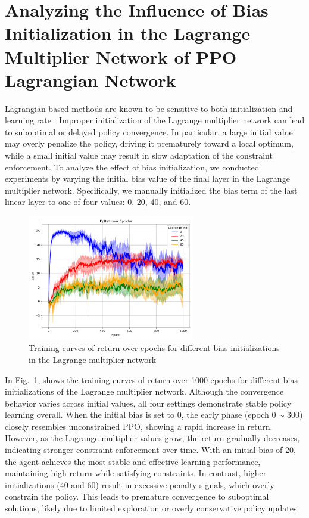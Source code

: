 \section{Analyzing the Influence of Bias Initialization in the Lagrange Multiplier Network of PPO Lagrangian Network} \label{chap4:sec:experiments:lagrange_init}

Lagrangian-based methods are known to be sensitive to both initialization and learning rate \cite{CRL-survey}. 
Improper initialization of the Lagrange multiplier network can lead to suboptimal or delayed policy convergence. 
In particular, a large initial value may overly penalize the policy, driving it prematurely toward a local optimum, while a small initial value may result in slow adaptation of the constraint enforcement.
To analyze the effect of bias initialization,  we conducted experiments by varying the initial bias value of the final layer in the Lagrange multiplier network. 
Specifically, we manually initialized the bias term of the last linear layer to one of four values: 0, 20, 40, and 60.

\begin{figure}[h]
  \centering
  \includegraphics[width=0.65\textwidth]{imgs/chap4/lagrange_init/return.pdf}
  \caption{Training curves of return over epochs for different bias initializations in the Lagrange multiplier network}
  \label{chap4:fig:lagrange_init_return}
\end{figure}

In Fig.~\ref{chap4:fig:lagrange_init_return}, shows the training curves of return over 1000 epochs for different bias initializations of the Lagrange multiplier network.
Although the convergence behavior varies across initial values, all four settings demonstrate stable policy learning overall.
When the initial bias is set to 0, the early phase (epoch $0 \sim 300$) closely resembles unconstrained PPO, showing a rapid increase in return.
However, as the Lagrange multiplier values grow, the return gradually decreases, indicating stronger constraint enforcement over time.
With an initial bias of 20, the agent achieves the most stable and effective learning performance, maintaining high return while satisfying constraints.
In contrast, higher initializations (40 and 60) result in excessive penalty signals, which overly constrain the policy.
This leads to premature convergence to suboptimal solutions, likely due to limited exploration or overly conservative policy updates.

